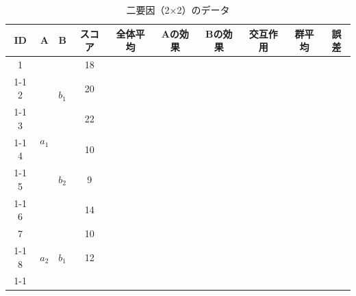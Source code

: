 \documentclass[a4paper,12pt]{ltjarticle}
\begin{document}
\begin{table}[ht]
	\centering
	\caption{二要因（2×2）のデータ}
	\small
	\begin{tabular}{|c|c|c|c|c|c|c|c|c|c|}
		\hline
		ID & A & B & スコア & 全体平均 & Aの効果 & Bの効果 & 交互作用 & 群平均 & 誤差 \\ \hline
		1        & \multirow{6}{*}{$a_1$} & \multirow{3}{*}{$b_1$} & 18   & \multirow{12}{*}{\hspace{2cm}}  & \multirow{6}{*}{\hspace{2cm}}  & \multirow{3}{*}{\hspace{2cm}}  & \multirow{3}{*}{\hspace{2cm}}  & \multirow{3}{*}{\hspace{2cm}}  & \hspace{2cm}   \\ \cline{1-1}\cline{4-4}\cline{10-10}
		2        &  &  & 20   &   &   &   &   &   & \hspace{2cm}   \\ \cline{1-1}\cline{4-4}\cline{10-10}
		3        &  &  & 22   &   &   &   &   &   & \hspace{2cm}   \\ \cline{1-1}\cline{3-4}\cline{7-10}
		4        &  & \multirow{3}{*}{$b_2$} & 10   &   &   & \multirow{3}{*}{\hspace{2cm}}  & \multirow{3}{*}{\hspace{2cm}}  & \multirow{3}{*}{\hspace{2cm}}  & \hspace{2cm}   \\ \cline{1-1}\cline{4-4}\cline{10-10}
		5        &  &  & 9   &   &   &   &   &   & \hspace{2cm}   \\ \cline{1-1}\cline{4-4}\cline{10-10}
		6        &  &  & 14   &   &   &   &   &   & \hspace{2cm}   \\ \hline
		7        & \multirow{6}{*}{$a_2$} & \multirow{3}{*}{$b_1$} & 10   &   & \multirow{6}{*}{\hspace{2cm}}  & \multirow{3}{*}{\hspace{2cm}}  & \multirow{3}{*}{\hspace{2cm}}  & \multirow{3}{*}{\hspace{2cm}}  & \hspace{2cm}   \\ \cline{1-1}\cline{4-4}\cline{10-10}
		8        &  &  & 12   &   &   &   &   &   & \hspace{2cm}   \\ \cline{1-1}\cline{4-4}\cline{10-10}

\end{tabular}
\end{table}
\end{document}
